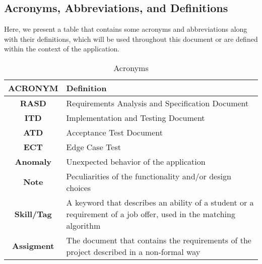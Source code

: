 \subsection{Acronyms, Abbreviations, and Definitions}
Here, we present a table that contains some acronyms and abbreviations along with their definitions, which will be used throughout this document or are defined within the context of the application.
\begin{table}[h!]
    \centering
    \begin{tabular}{|>{\bfseries}c|>{\centering\arraybackslash}p{}|}
        \hline
        \textbf{ACRONYM} & Definition \\
        \hline
        \textbf{RASD} & Requirements Analysis and Specification Document \\
        \hline
        \textbf{ITD} & Implementation and Testing Document \\
        \hline
        \textbf{ATD} & Acceptance Test Document \\
        \hline
        \textbf{ECT} & Edge Case Test \\
        \hline
        \textbf{Anomaly} & Unexpected behavior of the application \\
        \hline
        \textbf{Note} & Peculiarities of the functionality and/or design choices \\
        \hline
        \textbf{Skill/Tag} & A keyword that describes an ability of a student or a requirement of a job offer, used in the matching algorithm \\
        \hline
        \textbf{Assigment} & The document that contains the requirements of the project described in a non-formal way\\
        \hline
    \end{tabular}
    \caption{Acronyms}
    \label{tab:definitions}
\end{table}
  